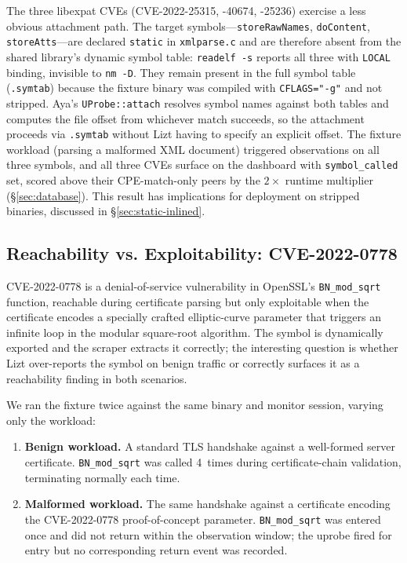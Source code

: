 \documentclass[conference]{IEEEtran}
\begin{document}
The three libexpat CVEs (CVE-2022-25315, -40674, -25236) exercise a less obvious attachment path. The target symbols---\texttt{storeRawNames}, \texttt{doContent}, \texttt{storeAtts}---are declared \texttt{static} in \texttt{xmlparse.c} and are therefore absent from the shared library's dynamic symbol table: \texttt{readelf~-s} reports all three with \texttt{LOCAL} binding, invisible to \texttt{nm~-D}. They remain present in the full symbol table (\texttt{.symtab}) because the fixture binary was compiled with \texttt{CFLAGS="-g"} and not stripped. Aya's \texttt{UProbe::attach} resolves symbol names against both tables and computes the file offset from whichever match succeeds, so the attachment proceeds via \texttt{.symtab} without Lizt having to specify an explicit offset. The fixture workload (parsing a malformed XML document) triggered observations on all three symbols, and all three CVEs surface on the dashboard with \texttt{symbol\_called} set, scored above their CPE-match-only peers by the $2\times$ runtime multiplier (\S\ref{sec:database}). This result has implications for deployment on stripped binaries, discussed in \S\ref{sec:static-inlined}.

\subsection{Reachability vs. Exploitability: CVE-2022-0778}
\label{sec:conditional}

CVE-2022-0778 is a denial-of-service vulnerability in OpenSSL's \texttt{BN\_mod\_sqrt} function, reachable during certificate parsing but only exploitable when the certificate encodes a specially crafted elliptic-curve parameter that triggers an infinite loop in the modular square-root algorithm. The symbol is dynamically exported and the scraper extracts it correctly; the interesting question is whether Lizt over-reports the symbol on benign traffic or correctly surfaces it as a reachability finding in both scenarios.

We ran the fixture twice against the same binary and monitor session, varying only the workload:

\begin{enumerate}[noitemsep]
  \item \textbf{Benign workload.} A standard TLS handshake against a well-formed server certificate. \texttt{BN\_mod\_sqrt} was called 4~times during certificate-chain validation, terminating normally each time.
  \item \textbf{Malformed workload.} The same handshake against a certificate encoding the CVE-2022-0778 proof-of-concept parameter. \texttt{BN\_mod\_sqrt} was entered once and did not return within the observation window; the uprobe fired for entry but no corresponding return event was recorded.
\end{enumerate}
\end{document}
